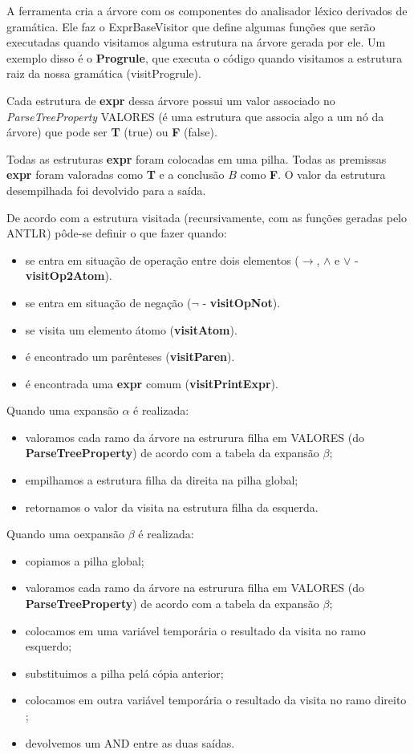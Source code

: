 \documentclass[12pt,letterpaper]{article}
\begin{document}
A ferramenta cria a árvore com os componentes do analisador léxico derivados de gramática. Ele faz o ExprBaseVisitor que define algumas funções que serão executadas quando visitamos alguma estrutura na árvore gerada por ele. Um exemplo disso é o \textbf{Progrule}, que executa o código quando visitamos a estrutura raiz da nossa gramática (visitProgrule).

Cada estrutura de \textbf{expr} dessa árvore possui um valor associado no \textit{ParseTreeProperty} VALORES (é uma estrutura que associa algo a um nó da árvore) que pode ser \textbf{T} (true) ou \textbf{F} (false).

Todas as estruturas \textbf{expr} foram colocadas em uma pilha. Todas as premissas \textbf{expr} foram valoradas como \textbf{T} e a conclusão $B$ como \textbf{F}. O valor da estrutura desempilhada foi devolvido para a saída.

De acordo com a estrutura visitada (recursivamente, com as funções geradas pelo ANTLR) pôde-se definir o que fazer quando:
\begin{itemize}
	\item se entra em situação de operação entre dois elementos ($\to$, $\land$ e $\lor$ - \textbf{visitOp2Atom}).
	\item se entra em situação de negação ($\lnot$ - \textbf{visitOpNot}).
	\item se visita um elemento átomo (\textbf{visitAtom}).
	\item é encontrado um parênteses (\textbf{visitParen}).
	\item é encontrada uma \textbf{expr} comum (\textbf{visitPrintExpr}).
\end{itemize} 

Quando uma expansão $\alpha$ é realizada:
\begin{itemize}
	\item valoramos cada ramo da árvore na estrurura filha em VALORES (do \textbf{ParseTreeProperty}) de acordo com a tabela da expansão $\beta$;
	\item empilhamos a estrutura filha da direita na pilha global;
	\item retornamos o valor da visita na estrutura filha da esquerda.
\end{itemize}

Quando uma oexpansão $\beta$ é realizada:
\begin{itemize}
	\item copiamos a pilha global;
	\item valoramos cada ramo da árvore na estrurura filha em VALORES (do \textbf{ParseTreeProperty}) de acordo com a tabela da expansão $\beta$;
	\item colocamos em uma variável temporária o resultado da visita no ramo esquerdo;
	\item substituimos a pilha pelá cópia anterior;
	\item colocamos em outra variável temporária o resultado da visita no ramo direito ;
	\item devolvemos um AND entre as duas saídas.
\end{itemize}
\end{document}
